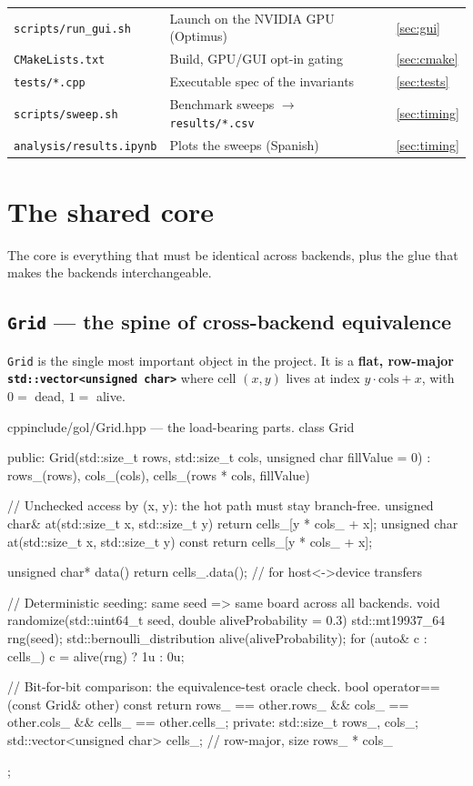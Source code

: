 \documentclass[
	english,
	letterpaper, oneside
]{article}
\begin{document}
\begin{table}[H]
\begin{tabular}{@{}lll@{}}
		\texttt{scripts/run\_gui.sh}              & Launch on the NVIDIA GPU (Optimus) & \ref{sec:gui} \\
		\texttt{CMakeLists.txt}                  & Build, GPU/GUI opt-in gating & \ref{sec:cmake} \\
		\texttt{tests/*.cpp}                     & Executable spec of the invariants & \ref{sec:tests} \\
		\texttt{scripts/sweep.sh}                & Benchmark sweeps $\to$ \texttt{results/*.csv} & \ref{sec:timing} \\
		\texttt{analysis/results.ipynb}          & Plots the sweeps (Spanish) & \ref{sec:timing} \\
		\bottomrule
	\end{tabular}
\end{table}

\section{The shared core}
\label{sec:core}

The core is everything that must be identical across backends, plus the glue
that makes the backends interchangeable.

\subsection{\texttt{Grid} --- the spine of cross-backend equivalence}
\label{sec:grid}

\texttt{Grid} is the single most important object in the project. It is a
\textbf{flat, row-major \texttt{std::vector<unsigned char>}} where cell $(x,y)$
lives at index $y\cdot\text{cols}+x$, with $0=$ dead, $1=$ alive.

\begin{sourcecode}{cpp}{include/gol/Grid.hpp --- the load-bearing parts.}
class Grid {
public:
  Grid(std::size_t rows, std::size_t cols, unsigned char fillValue = 0)
      : rows_(rows), cols_(cols), cells_(rows * cols, fillValue) {}

  // Unchecked access by (x, y): the hot path must stay branch-free.
  unsigned char& at(std::size_t x, std::size_t y) { return cells_[y * cols_ + x]; }
  unsigned char  at(std::size_t x, std::size_t y) const { return cells_[y * cols_ + x]; }

  unsigned char* data() { return cells_.data(); }            // for host<->device transfers

  // Deterministic seeding: same seed => same board across all backends.
  void randomize(std::uint64_t seed, double aliveProbability = 0.3) {
    std::mt19937_64 rng(seed);
    std::bernoulli_distribution alive(aliveProbability);
    for (auto& c : cells_) c = alive(rng) ? 1u : 0u;
  }

  // Bit-for-bit comparison: the equivalence-test oracle check.
  bool operator==(const Grid& other) const {
    return rows_ == other.rows_ && cols_ == other.cols_ && cells_ == other.cells_;
  }
private:
  std::size_t rows_, cols_;
  std::vector<unsigned char> cells_; // row-major, size rows_ * cols_
};
\end{sourcecode}
\end{document}

